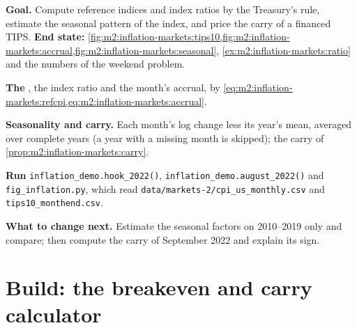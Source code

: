 \begin{tutorial}
\textbf{Goal.} Compute reference indices and index ratios by the Treasury's
rule, estimate the seasonal pattern of the index, and price the carry of a
financed TIPS. \textbf{End state:}
\cref{fig:m2:inflation-markets:tips10,fig:m2:inflation-markets:accrual,fig:m2:inflation-markets:seasonal},
\cref{ex:m2:inflation-markets:ratio} and the numbers of the weekend problem.
\begin{tutsteps}
\item \textbf{The }, the index ratio and the month's accrual,
by \cref{eq:m2:inflation-markets:refcpi,eq:m2:inflation-markets:accrual}.
\label{lst:m2:inflation-markets:ref}
\item \textbf{Seasonality and carry.} Each month's log change less its year's
mean, averaged over complete years (a year with a missing month is skipped); the carry of
\cref{prop:m2:inflation-markets:carry}.
\label{lst:m2:inflation-markets:carry}
\item \textbf{Run} \texttt{inflation\_demo.hook\_2022()},
\texttt{inflation\_demo.august\_2022()} and \texttt{fig\_inflation.py}, which
read \texttt{data/markets-2/cpi\_us\_monthly.csv} and
\texttt{tips10\_monthend.csv}.
\end{tutsteps}
\textbf{What to change next.} Estimate the seasonal factors on 2010--2019 only
and compare; then compute the carry of September 2022 and explain its sign.
\end{tutorial}

\section{Build: the breakeven and carry calculator}\label{bld:m2:inflation-markets:breakeven}

